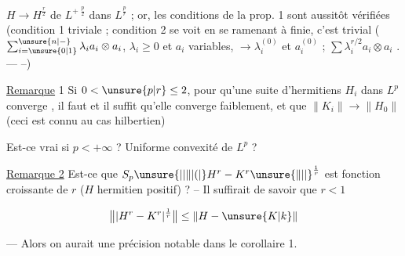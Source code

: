 $H\to H^{\frac r2}$ de $L^{+\;\frac p2}$ dans $L^{\frac pr}$ ; or, les conditions de la prop. 1 sont aussitôt vérifiées \unsure{(|\deleted{(}} (condition 1 triviale ; condition 2 se voit  en se ramenant à  finie,  c'est trivial ($\sum_{i=\unsure{0|1}}^{\unsure{n|-}}\lambda_i a_i\otimes a_i$, $\lambda_i\geq0$ et $a_i$ variables, $\to\lambda_i^{(0)}$ et $a_i^{(0)}$ ;   $\sum\lambda_i^{r/2}a_i\otimes a_i$ . --- --)

\uline{Remarque} 1 Si $0<\unsure{p|r}\leq2$, pour qu'une suite d'hermitiens $H_i$ dans $L^p$ converge , il faut et il suffit qu'elle converge faiblement, et que $\|K_i\|\to\|H_0\|$ (ceci est connu au cas hilbertien)

\margin{!}

Est-ce vrai si $p<+\infty$ ? Uniforme convexité de $L^p$ ?

\uline{Remarque 2} Est-ce que $S_p\unsure{\lvert|\lVert|(\lvert} H^r-K^r\unsure{\rVert|\rvert}^{\frac1r}$ est fonction croissante de $r$ ($H$ hermitien positif) ? -- Il suffirait de  savoir que $r<1$ 

\[
\bigl\|\lvert H^r-K^r\rvert^{\frac1r}\bigr\|\leq\|H-\unsure{K|k}\|
\]

--- Alors on aurait une précision notable dans le corollaire 1.
